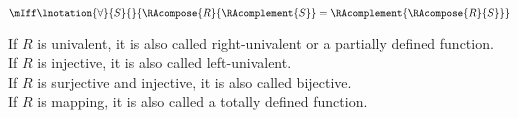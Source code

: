 \begin{definition}
\begin{enumerate}[(i)]
			  $\mIff \lnotation{\forall}{S}{}{\RAcompose{R}{\RAcomplement{S}} = \RAcomplement{\RAcompose{R}{S}}}$
	\end{enumerate}
	If $R$ is univalent, it is also called right-univalent or a partially defined function.\\
	If $R$ is injective, it is also called left-univalent.\\
	If $R$ is surjective and injective, it is also called bijective.\\
	If $R$ is mapping, it is also called a totally defined function.
\end{definition}